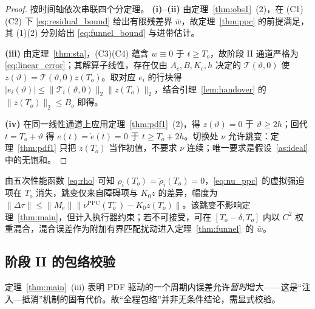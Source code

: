\begin{proof}
按时间轴依次串联四个分定理。
\textbf{(i)--(ii)} 由定理~\ref{thm:obs1}~(2)，在 \textup{(C1)(C2)} 下 \eqref{eq:residual_bound} 给出有限残差界 \(\bar w\)，故定理~\ref{thm:ppc} 的前提满足，其 (1)(2) 分别给出 \eqref{eq:funnel_bound} 与进带估计。

\textbf{(iii)} 由定理~\ref{thm:sta}，\textup{(C3)(C4)} 蕴含 \(w\equiv0\) 于 \(t\ge T_o\)，故阶段 II 通道严格为 \eqref{eq:linear_error}；其解算子线性，存在仅由 \(A_c,B,K_c,h\) 决定的 \(\mathcal T(\vartheta,0)\) 使 \(z(\vartheta)=\mathcal T(\vartheta,0)z(T_o)\)。取对应 \(e_i\) 的行块得 \(\lvert e_i(\vartheta)\rvert\le\lVert\mathcal T_i(\vartheta,0)\rVert_2\lVert z(T_o)\rVert_2\)，结合引理~\ref{lem:handover} 的 \(\lVert z(T_o)\rVert_2\le B_o\) 即得。

\textbf{(iv)} 在同一线性通道上应用定理~\ref{thm:pdf1}~(2)，得 \(z(\vartheta)=0\) 于 \(\vartheta\ge2h\)；回代 \(t=T_o+\vartheta\) 得 \(e(t)=\dot e(t)=0\) 于 \(t\ge T_o+2h\)。切换处 \(\nu\) 允许跳变：定理~\ref{thm:pdf1} 只把 \(z(T_o)\) 当作初值，不要求 \(\nu\) 连续；唯一要求是假设~\ref{as:ideal} 中的无饱和。
\end{proof}

\begin{remark}[切换处的力矩跳变]\label{rem:jump}
由五次性能函数 \eqref{eq:rho} 可知 \(\dot\rho_i(T_o)=\ddot\rho_i(T_o)=0\)，\eqref{eq:nu_ppc}~的虚拟强迫项在 \(T_o\) 消失，跳变仅来自障碍项与 \(K_0z\) 的差异，幅度为 \(\lVert\Delta\tau\rVert\le\lVert M_e\rVert\lVert\nu^{\mathrm{PPC}}(T_o^-)-K_0z(T_o)\rVert\)。该跳变不影响定理~\ref{thm:main}，但计入执行器约束；若不可接受，可在 \([T_o-\delta,T_o]\) 内以 \(C^2\) 权重混合，混合误差作为附加有界匹配扰动进入定理~\ref{thm:funnel}~的 \(\bar w\)。
\end{remark}

\subsection{阶段 II 的包络校验}
\label{sec:stage2}

定理~\ref{thm:main}~(iii) 表明 PDF 驱动的一个周期内误差允许\emph{暂时}增大——这是“注入—抵消”机制的固有代价。故“全程包络”并非无条件结论，需显式校验。

